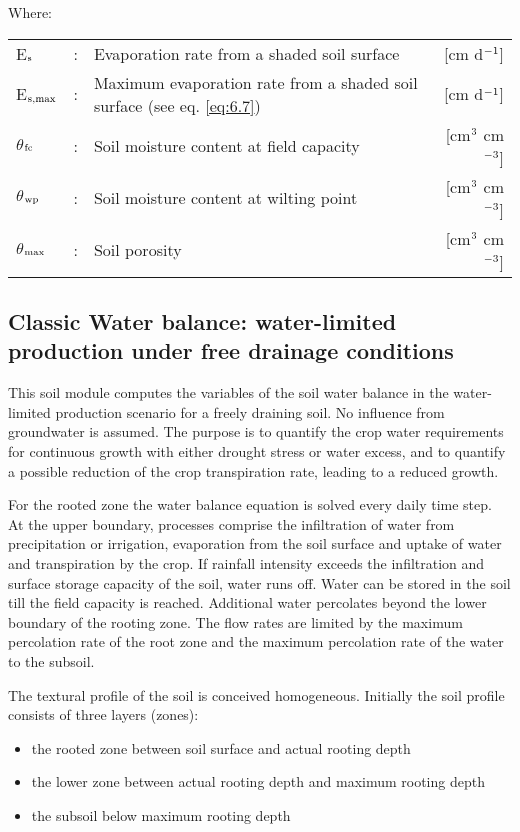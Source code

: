 Where:\\[5pt]
\begin{tabularx}{\textwidth}{llXr}
	E$_{{\rm s}}$ &:& Evaporation rate from a shaded soil surface & [cm d$^{{\rm -1}}$]\\
	E$_{{\rm s,max}}$ &:& Maximum evaporation rate from a shaded
	soil surface (see eq. \ref{eq:6.7}) & [cm d$^{{\rm -1}}$]\\
	$\theta$$_{{\rm fc}}$ &:& Soil moisture content at field capacity & [cm$^{{\rm 3}}$ cm$^{{\rm -3}}$]\\
	$\theta$$_{{\rm wp}}$ &:& Soil moisture content at wilting point & [cm$^{{\rm 3}}$ cm$^{{\rm -3}}$]\\
	$\theta$$_{{\rm max}}$ &:& Soil porosity & [cm$^{{\rm 3}}$ cm$^{{\rm -3}}$]\\
\end{tabularx}


\subsection{Classic Water balance: water-limited production under free drainage conditions}
\label{sec:WATFD}

This soil module computes the variables of the soil water balance in the 
water-limited production scenario for a freely draining soil. No influence from
groundwater is assumed. The purpose is to quantify the crop water requirements for
continuous growth with either drought stress or water excess, and to quantify a possible
reduction of the crop transpiration rate, leading to a reduced growth.

For the rooted zone the water balance equation is solved every daily time step. At the
upper boundary, processes comprise the infiltration of water from precipitation or
irrigation, evaporation from the soil surface and uptake of water and transpiration by the
crop. If rainfall intensity exceeds the infiltration and surface storage capacity of the soil,
water runs off. Water can be stored in the soil till the field capacity is reached. Additional
water percolates beyond the lower boundary of the rooting zone.
The flow rates are limited by the maximum percolation rate of the root zone and the
maximum percolation rate of the water to the subsoil.

The textural profile of the soil is conceived homogeneous. Initially the soil profile
consists of three layers (zones):
\begin{itemize}
	\item the rooted zone between soil surface and actual rooting depth
	\item the lower zone between actual rooting depth and maximum rooting depth
	\item the subsoil below maximum rooting depth
\end{itemize}


